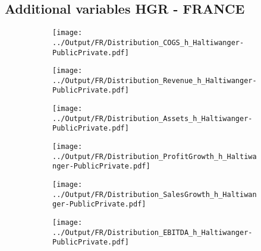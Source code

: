\documentclass[12pt,notitlepage]{article}
\begin{document}
\subsection*{Additional variables HGR - FRANCE}
\begin{figure}[!htpb]
\centering
\begin{subfigure}{.49\textwidth}
    \centering
 \texttt{[image: ../Output/FR/Distribution\_COGS\_h\_Haltiwanger-PublicPrivate.pdf]}
\end{subfigure}%
\begin{subfigure}{.49\textwidth}
    \centering
 \texttt{[image: ../Output/FR/Distribution\_Revenue\_h\_Haltiwanger-PublicPrivate.pdf]}
\end{subfigure}
\begin{subfigure}{.49\textwidth}
    \centering
 \texttt{[image: ../Output/FR/Distribution\_Assets\_h\_Haltiwanger-PublicPrivate.pdf]}
\end{subfigure}%
\begin{subfigure}{.49\textwidth}
    \centering
 \texttt{[image: ../Output/FR/Distribution\_ProfitGrowth\_h\_Haltiwanger-PublicPrivate.pdf]}
\end{subfigure}
\begin{subfigure}{.49\textwidth}
    \centering
 \texttt{[image: ../Output/FR/Distribution\_SalesGrowth\_h\_Haltiwanger-PublicPrivate.pdf]}
\end{subfigure}
\begin{subfigure}{.49\textwidth}
    \centering
 \texttt{[image: ../Output/FR/Distribution\_EBITDA\_h\_Haltiwanger-PublicPrivate.pdf]}
\end{subfigure}
\end{figure}
\clearpage
\end{document}
